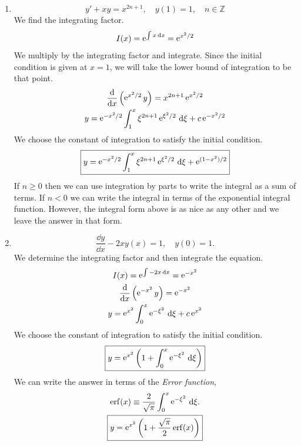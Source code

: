 \begin{Solution}
  \label{solution dydx + x y = x 2n+1}
  \begin{enumerate}
  \item
    \[
    y' + x y = x^{2n+1}, \quad y(1) = 1, \quad n \in \mathbb{Z}
    \]
    We find the integrating factor.
    \[
    I(x) = \mathop{\mathrm{e}}\nolimits^{\int x \,\mathrm{d} x} = \mathop{\mathrm{e}}\nolimits^{x^2 / 2}
    \]
    We multiply by the integrating factor and integrate.  Since the initial 
    condition is given at $x = 1$, we will take the lower bound of integration
    to be that point.
    \begin{gather*}
      \frac{\mathrm{d}}{\mathrm{d} x} \left( \mathop{\mathrm{e}}\nolimits^{x^2 / 2} y \right) = x^{2n+1} \mathop{\mathrm{e}}\nolimits^{x^2 / 2} 
      \\
      y = \mathop{\mathrm{e}}\nolimits^{-x^2 / 2} \int_1^x \xi^{2n+1} \mathop{\mathrm{e}}\nolimits^{\xi^2 / 2} \,\mathrm{d} \xi + c \mathop{\mathrm{e}}\nolimits^{-x^2 / 2}
    \end{gather*}
    We choose the constant of integration to satisfy the initial condition.
    \[
    \boxed{
      y = \mathop{\mathrm{e}}\nolimits^{-x^2 / 2} \int_1^x \xi^{2n+1} \mathop{\mathrm{e}}\nolimits^{\xi^2 / 2} \,\mathrm{d} \xi + \mathop{\mathrm{e}}\nolimits^{(1-x^2) / 2}
      }
    \]
    If $n \geq 0$ then we can use integration by parts to write the integral
    as a sum of terms.  If $n < 0$ we can write the integral in terms of 
    the exponential integral function.  However, the integral form above is
    as nice as any other and we leave the answer in that form.
  \item
    \[
    \frac{\dd y}{\dd x} - 2 x y(x) = 1, \quad y(0) = 1.
    \]
    We determine the integrating factor and then integrate the equation.
    \begin{gather*}
      I(x) = \mathop{\mathrm{e}}\nolimits^{\int - 2 x \,\mathrm{d} x} = \mathop{\mathrm{e}}\nolimits^{- x^2}
      \\
      \frac{\mathrm{d}}{\mathrm{d} x} \left( \mathop{\mathrm{e}}\nolimits^{-x^2} y \right) = \mathop{\mathrm{e}}\nolimits^{-x^2} 
      \\
      y = \mathop{\mathrm{e}}\nolimits^{x^2} \int_0^x \mathop{\mathrm{e}}\nolimits^{-\xi^2} \,\mathrm{d} \xi + c \mathop{\mathrm{e}}\nolimits^{x^2}
    \end{gather*}
    We choose the constant of integration to satisfy the initial condition.
    \[
    \boxed{
      y = \mathop{\mathrm{e}}\nolimits^{x^2} \left( 1 + \int_0^x \mathop{\mathrm{e}}\nolimits^{-\xi^2} \,\mathrm{d} \xi \right)
      }
    \]
    We can write the answer in terms of the \textit{Error function},
    \begin{gather*}
      \mathop{\mathrm{erf}}\nolimits(x) \equiv \frac{2}{\sqrt{\pi}} \int_0^x \mathop{\mathrm{e}}\nolimits^{-\xi^2} \,\mathrm{d} \xi.
      \\
      \boxed{
        y = \mathop{\mathrm{e}}\nolimits^{x^2} \left( 1 + \frac{\sqrt{\pi}}{2} \mathop{\mathrm{erf}}\nolimits(x) \right)
        }
    \end{gather*}
  \end{enumerate}
\end{Solution}







